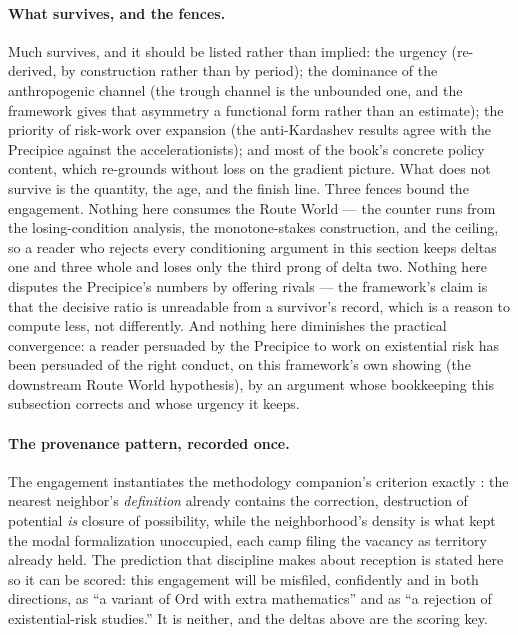 \paragraph{What survives, and the fences.} Much survives, and it
should be listed rather than implied: the urgency (re-derived, by
construction rather than by period); the dominance of the
anthropogenic channel (the trough channel is the unbounded one, and
the framework gives that asymmetry a functional form rather than an
estimate); the priority of risk-work over expansion (the
anti-Kardashev results agree with the Precipice against the
accelerationists); and most of the book's concrete policy content,
which re-grounds without loss on the gradient picture. What does not
survive is the quantity, the age, and the finish line. Three fences
bound the engagement. Nothing here consumes the Route World --- the
counter runs from the losing-condition analysis, the monotone-stakes
construction, and the ceiling, so a reader who rejects every
conditioning argument in this section keeps deltas one and three
whole and loses only the third prong of delta two. Nothing here
disputes the Precipice's numbers by offering rivals --- the
framework's claim is that the decisive ratio is unreadable from a
survivor's record, which is a reason to compute less, not
differently. And nothing here diminishes the practical convergence:
a reader persuaded by the Precipice to work on existential risk has
been persuaded of the right conduct, on this framework's own showing
(the downstream Route World hypothesis), by an argument whose bookkeeping this
subsection corrects and whose urgency it keeps.

\paragraph{The provenance pattern, recorded once.} The engagement
instantiates the methodology companion's criterion exactly
\cite{AethusMethodology}: the nearest neighbor's \emph{definition} already
contains the correction, destruction of potential \emph{is}
closure of possibility, while the neighborhood's density is what
kept the modal formalization unoccupied, each camp filing the vacancy
as territory already held. The prediction that discipline makes about
reception is stated here so it can be scored: this engagement will be
misfiled, confidently and in both directions, as ``a variant of Ord
with extra mathematics'' and as ``a rejection of existential-risk
studies.'' It is neither, and the deltas above are the scoring key.

